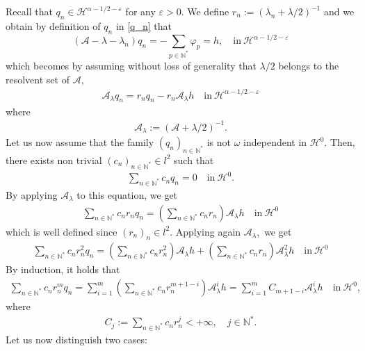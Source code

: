 \documentclass[11pt, dvipsnames]{amsart}
\begin{document}
Recall that $q_n\in \mathcal{H}^{\alpha-1/2-\varepsilon}$ for any $\varepsilon>0.$ We define $r_n:=(\lambda_n+\lambda/2)^{-1}$ and we obtain by definition of $q_n$ in \eqref{q_n} that
\begin{equation*}
    (\mathcal{A}-\lambda-\lambda_n)q_n=-\sum_{p\in \mathbb{N}^*}\varphi_p=h,\quad \text{in}\ \mathcal{H}^{\alpha-1/2-\varepsilon}
\end{equation*} which becomes by assuming without loss of generality that $\lambda/2$ belongs to the resolvent set of $\mathcal{A},$
\begin{align*}
    \mathcal{A}_{\lambda}q_n=r_n q_n-r_n\mathcal{A}_{\lambda}h\quad \text{in}\ \mathcal{H}^{\alpha-1/2-\varepsilon}
\end{align*} where
\begin{align*}
    \mathcal{A}_{\lambda}:=(\mathcal{A}+\lambda/2)^{-1}.
\end{align*}
Let us now assume that the family $(q_n)_{n\in \mathbb{N}^*}$ is not $\omega$ independent in ${\mathcal{H}^0}$. Then, there exists non trivial $(c_n)_{n\in \mathbb{N}^*}\in l^2$  such that 
\begin{align*}
    \sum_{n\in \mathbb{N}^*}c_n q_n=0\quad \text{in}\ {\mathcal{H}^0}.
\end{align*}
By applying $\mathcal{A}_{\lambda}$ to this equation, we get
\begin{align*}
    \sum_{n\in \mathbb{N}^*}c_n r_n q_n=\left(\sum_{n\in \mathbb{N}^*}c_n r_n \right)\mathcal{A}_{\lambda}h\quad \text{in}\ {\mathcal{H}^0}
\end{align*} which is well defined since $(r_n)_n\in l^2.$
Applying again $\mathcal{A}_{\lambda},$ we get
\begin{align*}
    \sum_{n\in \mathbb{N}^*}c_n r_n^2 q_n=\left(\sum_{n\in \mathbb{N}^*}c_n r_n^2 \right)\mathcal{A}_{\lambda}h+\left(\sum_{n\in \mathbb{N}^*}c_n r_n \right)\mathcal{A}_{\lambda}^2h\quad \text{in}\ {\mathcal{H}^0}
\end{align*}
By induction, it holds that
\begin{align}
    \sum_{n\in \mathbb{N}^*}c_nr_n^m q_n=\sum_{i=1}^{m}\left(\sum_{n\in \mathbb{N}^*}c_nr_n^{m+1-i}\right)\mathcal{A}_{\lambda}^i h=\sum_{i=1}^{m}C_{m+1-i} \mathcal{A}_{\lambda}^i h\quad \text{in}\ {\mathcal{H}^0},\label{S-induc}
\end{align} where 
\begin{align*}
    C_j:=\sum_{n\in \mathbb{N}^*}c_nr_n^j<+\infty, \quad j\in \mathbb{N}^*.
\end{align*}
Let us now distinguish two cases:
\end{document}
